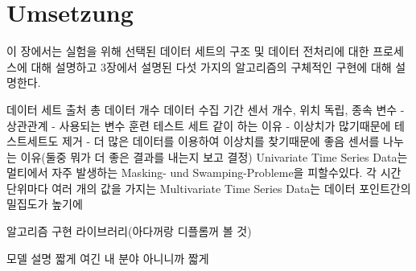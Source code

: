 \chapterpage\chapter{Umsetzung}
    이 장에서는 실험을 위해 선택된 데이터 세트의 구조 및 데이터 전처리에 대한 프로세스에 대해 설명하고 3장에서 설명된 다섯 가지의 알고리즘의 구체적인 구현에 대해 설명한다.

    
    데이터 세트
        출처
        총 데이터 개수
        데이터 수집 기간
        센서 개수, 위치
        독립, 종속 변수 - 상관관계 - 사용되는 변수
        훈련 테스트 세트 같이 하는 이유
            - 이상치가 많기때문에 테스트세트도 제거
            - 더 많은 데이터를 이용하여 이상치를 찾기때문에 좋음
        센서를 나누는 이유(둘중 뭐가 더 좋은 결과를 내는지 보고 결정)
            Univariate Time Series Data는 멀티에서 자주 발생하는 Masking- und Swamping-Probleme을 피할수있다.
            각 시간 단위마다 여러 개의 값을 가지는 Multivariate Time Series Data는 데이터 포인트간의 밀집도가 높기에


    알고리즘 구현
        라이브러리(아다꺼랑 디플롬꺼 볼 것)

    모델 설명 짧게
        여긴 내 분야 아니니까 짧게
